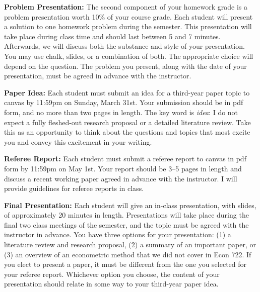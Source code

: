 \documentclass[11pt, letterpaper]{article}
\begin{document}
\medskip

\noindent \textbf{Problem Presentation:}
The second component of your homework grade is a problem presentation worth 10\% of your course grade.
Each student will present a solution to one homework problem during the semester.
This presentation will take place during class time and should last between 5 and 7 minutes.
Afterwards, we will discuss both the substance and style of your presentation.
You may use chalk, slides, or a combination of both.
The appropriate choice will depend on the question.
The problem you present, along with the date of your presentation, must be agreed in advance with the instructor.

\medskip

\noindent \textbf{Paper Idea:}
Each student must submit an idea for a third-year paper topic to canvas by 11:59pm on Sunday, March 31st.
Your submission should be in pdf form, and no more than two pages in length.
The key word is \emph{idea}: I do not expect a fully fleshed-out research proposal or a detailed literature review.
Take this as an opportunity to think about the questions and topics that most excite you and convey this excitement in your writing.

\medskip
\noindent \textbf{Referee Report:} 
Each student must submit a referee report to canvas in pdf form by 11:59pm on May 1st. 
Your report should be 3--5 pages in length and discuss a recent working paper agreed in advance with the instructor.
I will provide guidelines for referee reports in class.

\medskip 
\noindent \textbf{Final Presentation:} 
Each student will give an in-class presentation, with slides, of approximately 20 minutes in length.
Presentations will take place during the final two class meetings of the semester, and the topic must be agreed with the instructor in advance.
You have three options for your presentation: (1) a literature review and research proposal, (2) a summary of an important paper, or (3) an overview of an econometric method that we did not cover in Econ 722.
If you elect to present a paper, it must be different from the one you selected for your referee report.
Whichever option you choose, the content of your presentation should relate in some way to your third-year paper idea.



\newpage

\end{document}
